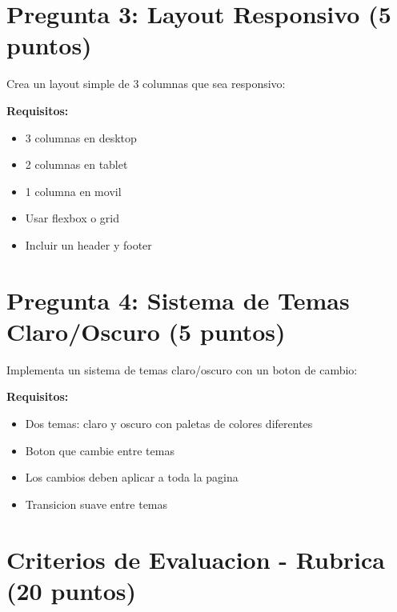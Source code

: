 \documentclass[12pt, a4paper]{article}
\newcommand{\pregunta}[2]{
    \section*{Pregunta #1: #2}
    \vspace{0.3em}
}
\begin{document}
\pregunta{3}{Layout Responsivo (5 puntos)}
Crea un layout simple de 3 columnas que sea responsivo:

\textbf{Requisitos:}
\begin{itemize}
\item 3 columnas en desktop
\item 2 columnas en tablet
\item 1 columna en movil
\item Usar flexbox o grid
\item Incluir un header y footer
\end{itemize}


\pregunta{4}{Sistema de Temas Claro/Oscuro (5 puntos)}
Implementa un sistema de temas claro/oscuro con un boton de cambio:

\textbf{Requisitos:}
\begin{itemize}
\item Dos temas: claro y oscuro con paletas de colores diferentes
\item Boton que cambie entre temas
\item Los cambios deben aplicar a toda la pagina
\item Transicion suave entre temas
\end{itemize}



\section*{Criterios de Evaluacion - Rubrica (20 puntos)}
\end{document}
